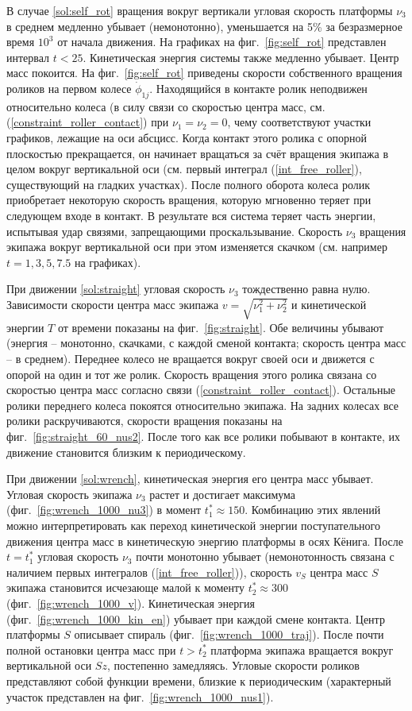 В случае \ref{sol:self_rot} вращения вокруг вертикали угловая скорость платформы $\nu_3$ в среднем медленно убывает (немонотонно), уменьшается на 5\%  за безразмерное время $10^3$ от начала движения. На графиках на фиг.~\ref{fig:self_rot} представлен интервал $t < 25$.  Кинетическая энергия системы также медленно убывает. Центр масс покоится. На фиг.~\ref{fig:self_rot} приведены скорости собственного вращения роликов на первом колесе $\dot{\phi}_{1j}$. Находящийся в контакте ролик неподвижен относительно колеса (в силу связи со скоростью центра масс, см. (\ref{constraint_roller_contact}) при $\nu_1 = \nu_2 = 0$, чему соответствуют участки графиков, лежащие на оси абсцисс. Когда контакт этого ролика с опорной плоскостью прекращается, он начинает вращаться за счёт вращения экипажа в целом вокруг вертикальной оси (см. первый интеграл (\ref{int_free_roller}), существующий на гладких участках). После полного оборота колеса ролик приобретает некоторую скорость вращения, которую мгновенно теряет при следующем входе в контакт. В результате вся система теряет часть энергии, испытывая удар связями, запрещающими проскальзывание. Скорость $\nu_3$ вращения экипажа вокруг вертикальной оси при этом изменяется скачком (см. например $t=1, 3, 5, 7.5$ на графиках).

При движении \ref{sol:straight} угловая скорость $\nu_3$ тождественно равна нулю. Зависимости скорости центра масс экипажа $v = \sqrt{\nu_1^2+\nu_2^2}$ и кинетической энергии $T$ от времени показаны на фиг.~\ref{fig:straight}. Обе величины убывают (энергия -- монотонно, скачками, с каждой сменой контакта; скорость центра масс -- в среднем). Переднее колесо не вращается вокруг своей оси и движется с опорой на один и тот же ролик. Скорость вращения этого ролика связана со скоростью центра масс согласно связи (\ref{constraint_roller_contact}). Остальные ролики переднего колеса покоятся относительно экипажа. На задних колесах все ролики раскручиваются, скорости вращения показаны на фиг.~\ref{fig:straight_60_nus2}. После того как все ролики побывают в контакте, их движение становится близким к периодическому.

При движении \ref{sol:wrench}, кинетическая энергия его центра масс убывает. Угловая скорость экипажа $\nu_3$ растет и достигает максимума (фиг.~\ref{fig:wrench_1000_nu3}) в момент $t^*_1 \approx 150$. Комбинацию этих явлений можно интерпретировать как переход кинетической энергии поступательного движения центра масс в кинетическую энергию платформы в осях Кёнига. После $t = t^*_1$ угловая скорость $\nu_3$ почти монотонно убывает (немонотонность связана с наличием первых интегралов (\ref{int_free_roller})), скорость $v_S$ центра масс $S$ экипажа становится исчезающе малой к моменту $t^*_2 \approx 300$ (фиг.~\ref{fig:wrench_1000_v}). Кинетическая энергия (фиг.~\ref{fig:wrench_1000_kin_en}) убывает при каждой смене контакта. Центр платформы $S$ описывает спираль (фиг.~\ref{fig:wrench_1000_traj}). После почти полной остановки центра масс при  $t > t^*_2$ платформа экипажа вращается вокруг вертикальной оси $Sz$, постепенно замедляясь. Угловые скорости роликов представляют собой функции времени, близкие к периодическим (характерный участок представлен на фиг.~\ref{fig:wrench_1000_nus1}).

